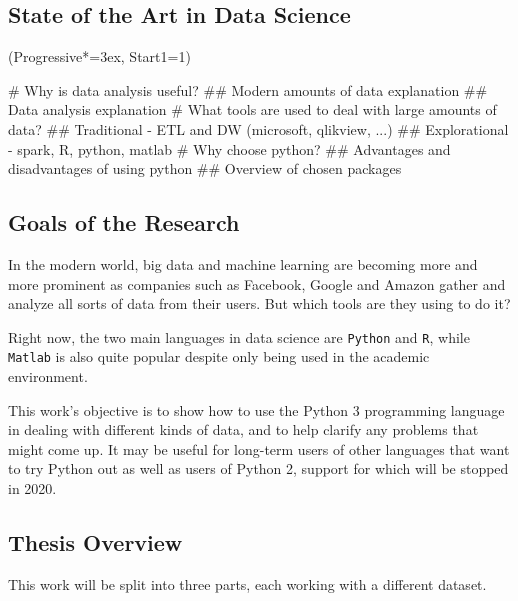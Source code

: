 \documentclass[12pt, a4paper]{article}
\let\OldEasylist\easylist
\let\OldEndEasylist\endeasylist
\renewenvironment{easylist}{%
    \OldEasylist%
    \ListProperties(Progressive*=3ex, Start1=1)%
}{%
    \OldEndEasylist%
}%
\begin{document}
\subsection{State of the Art in Data Science}
\begin{easylist}
# Why is data analysis useful?
## Modern amounts of data explanation
## Data analysis explanation
# What tools are used to deal with large amounts of data?
## Traditional - ETL and DW (microsoft, qlikview, ...)
## Explorational - spark, R, python, matlab
# Why choose python?
## Advantages and disadvantages of using python
## Overview of chosen packages
\end{easylist}

\subsection{Goals of the Research}
In the modern world, big data and machine learning are becoming more and more prominent as companies such as Facebook, Google and Amazon gather and analyze all sorts of data from their users. But which tools are they using to do it?

Right now, the two main languages in data science are \texttt{Python} and \texttt{R}, while \texttt{Matlab} is also quite popular despite only being used in the academic environment.

This work's objective is to show how to use the Python 3 programming language in dealing with different kinds of data, and to help clarify any problems that might come up. It may be useful for long-term users of other languages that want to try Python out as well as users of Python 2, support for which will be stopped in 2020.
\subsection{Thesis Overview}
This work will be split into three parts, each working with a different dataset.
\end{document}
